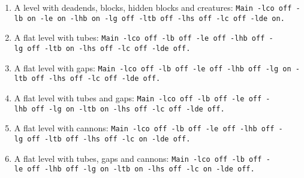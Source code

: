 \documentclass{report}
\begin{document}
\begin{enumerate}
\item A level with deadends, blocks, hidden blocks and creatures:\newline %
\texttt{Main~-lco~off~-lb~on~-le~on~-lhb~on~-lg~off~-ltb~off~-lhs~off~-lc~off~-lde~on.}
\item A flat level with tubes: \newline %
\texttt{Main~-lco~off~-lb~off~-le~off~-lhb~off~-lg~off~-ltb~on~-lhs~off~-lc~off~-lde~off.}
\item A flat level with gaps: \newline %
\texttt{Main~-lco~off~-lb~off~-le~off~-lhb~off~-lg~on~-ltb~off~-lhs~off~-lc~off~-lde~off.}
\item A flat level with tubes and gaps: \newline %
\texttt{Main~-lco~off~-lb~off~-le~off~-lhb~off~-lg~on~-ltb~on~-lhs~off~-lc~off~-lde~off.}
\item A flat level with cannons: \newline %
\texttt{Main~-lco~off~-lb~off~-le~off~-lhb~off~-lg~off~-ltb~off~-lhs~off~-lc~on~-lde~off.}
\item A flat level with tubes, gaps and cannons: \newline %
\texttt{Main~-lco~off~-lb~off~-le~off~-lhb~off~-lg~on~-ltb~on~-lhs~off~-lc~on~-lde~off.}
\end{enumerate}
\end{document}
